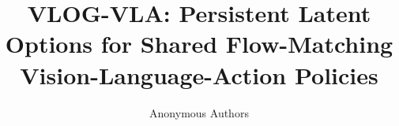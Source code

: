 \documentclass[letterpaper]{article} %
\title{VLOG-VLA: Persistent Latent Options for Shared Flow-Matching Vision-Language-Action Policies}
\author{Anonymous Authors}
\begin{document}
\maketitle

\begin{abstract}

\end{abstract}










\appendix

\end{document}
